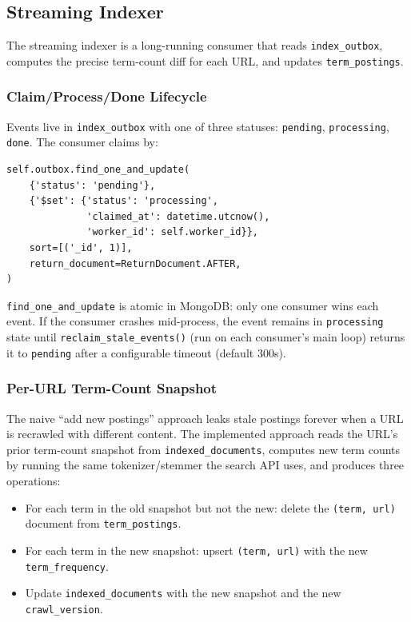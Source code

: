 \documentclass[11pt,a4paper]{article}
\newcommand{\code}[1]{\texttt{#1}}
\begin{document}
\subsection{Streaming Indexer}
\label{sec:streaming-indexer}

The streaming indexer is a long-running consumer that reads \code{index\_outbox}, computes the precise term-count diff for each URL, and updates \code{term\_postings}.

\subsubsection{Claim/Process/Done Lifecycle}

Events live in \code{index\_outbox} with one of three statuses: \code{pending}, \code{processing}, \code{done}. The consumer claims by:

\begin{lstlisting}
self.outbox.find_one_and_update(
    {'status': 'pending'},
    {'$set': {'status': 'processing',
              'claimed_at': datetime.utcnow(),
              'worker_id': self.worker_id}},
    sort=[('_id', 1)],
    return_document=ReturnDocument.AFTER,
)
\end{lstlisting}

\code{find\_one\_and\_update} is atomic in MongoDB: only one consumer wins each event. If the consumer crashes mid-process, the event remains in \code{processing} state until \code{reclaim\_stale\_events()} (run on each consumer's main loop) returns it to \code{pending} after a configurable timeout (default 300s).

\subsubsection{Per-URL Term-Count Snapshot}

The naive ``add new postings'' approach leaks stale postings forever when a URL is recrawled with different content. The implemented approach reads the URL's prior term-count snapshot from \code{indexed\_documents}, computes new term counts by running the same tokenizer/stemmer the search API uses, and produces three operations:

\begin{itemize}[leftmargin=1.4em]
  \item For each term in the old snapshot but not the new: delete the \code{(term, url)} document from \code{term\_postings}.
  \item For each term in the new snapshot: upsert \code{(term, url)} with the new \code{term\_frequency}.
  \item Update \code{indexed\_documents} with the new snapshot and the new \code{crawl\_version}.
\end{itemize}
\end{document}
